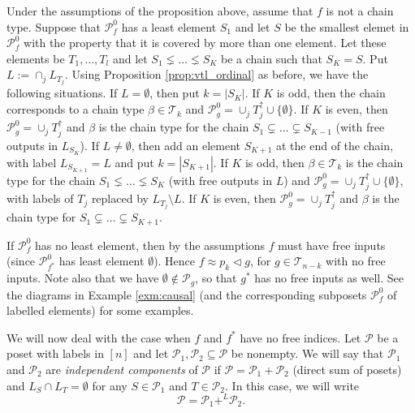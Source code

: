 \documentclass[12pt]{article}
\theoremstyle{definition}
\theoremstyle{remark}
\def\indep{+^L}
\def\Te{\mathcal T}
\def\Pe{\mathcal P}
\def\vtl{\vartriangleleft}
\begin{document}
Under the assumptions of the proposition above, assume that $f$ is not a chain type. 
Suppose that $\Pe_f^0$ has a least element $S_1$ and let $S$ be the smallest elemet in
$\Pe_f^0$ with the property that it is covered by more than one element. Let these
elements be $T_1,\dots, T_l$ and let  $S_1\lneq \dots \lneq S_K$ be a chain such that $S_K=S$.
Put $L:=\cap_j L_{T_j}$. 
Using
Proposition \ref{prop:vtl_ordinal} as before, we have the following situations. If  $L=\emptyset$, then put  $k=|S_K|$. 
If $K$ is odd, then the chain corresponds to a chain type
$\beta\in \Te_{k}$ and $\Pe_g^0=\cup_j T_j^{\uparrow}\cup\{\emptyset\}$. If $K$ is even, then $\Pe_g^0=\cup_j T_j^{\uparrow}$ and $\beta$
is the chain type for the chain $S_1\subsetneq \dots\subsetneq S_{K-1}$ (with free outputs
in $L_{S_K}$). If $L\ne \emptyset$, then add an element $S_{K+1}$ at the end of the chain, with label
$L_{S_{K+1}}=L$ and put $k=|S_{K+1}|$. If $K$ is odd, then $\beta\in \Te_k$ is the chain type for the chain
$S_1\lneq \dots \lneq S_K$ (with free outputs in $L$) and $\Pe_g^0=\cup_j
T_j^{\uparrow}\cup \{\emptyset\}$, with labels of $T_j$ replaced by $L_{T_j}\setminus L$.  If
$K$ is even, then $\Pe_g^0=\cup_j T_j^{\uparrow}$ and $\beta$ is the chain type  for
$S_1\subsetneq\dots\subsetneq S_{K+1}$.

If $\Pe_f^0$ has no least element, then by the assumptions $f$ must have free inputs (since $\Pe_{f^*}^0$
has least element $\emptyset$). Hence  $f\approx p_k\vtl g$, for $g\in \Te_{n-k}$ with no
free inputs. Note also that we have  $\emptyset
\notin \Pe_g$, so that $g^*$ has no free inputs as well. See the diagrams in Example \ref{exm:causal} (and the corresponding
subposets $\Pe_f^0$ of labelled elements) for some examples.




We will now deal with the case when $f$ and $f^*$ have no free indices.
Let $\Pe$ be a poset with labels in $[n]$ and let $\Pe_1,\Pe_2\subseteq \Pe$ be nonempty. We will say that $\Pe_1$ and $\Pe_2$ are {\em independent
components} of $\Pe$ if $\Pe=\Pe_1+\Pe_2$ (direct sum of posets) and $L_S\cap L_T=\emptyset$ for 
any $S\in \Pe_1$ and $T\in \Pe_2$. In this case, we will write
\[
\Pe=\Pe_1\indep \Pe_2.
\]
\end{document}
